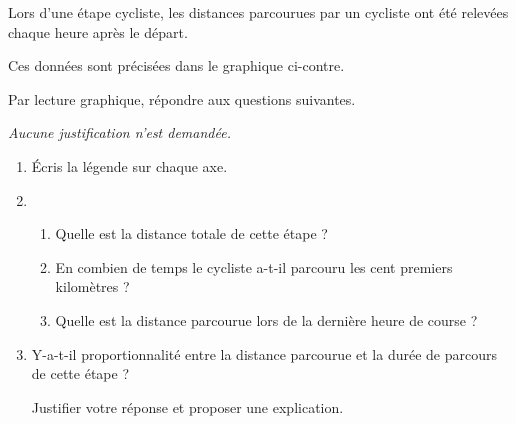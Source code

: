 
\begin{minipage}{0.39\linewidth}
Lors d'une étape cycliste, les distances parcourues par un cycliste ont été relevées
chaque heure après le départ.

Ces données sont précisées dans le graphique ci-contre.

Par lecture graphique, répondre aux questions suivantes.

\emph{Aucune justification n'est demandée.}

\medskip

\begin{enumerate}
\item Écris la légende sur chaque axe.

\item 
	\begin{enumerate}
		\item Quelle est la distance totale de cette étape ?
		\item En combien de temps le cycliste a-t-il parcouru les cent premiers kilomètres ?
		\item Quelle est la distance parcourue lors de la dernière heure de course ?
	\end{enumerate}
\item  Y-a-t-il proportionnalité entre la distance parcourue et la durée de parcours de cette
étape ?
	
Justifier votre réponse et proposer une explication.	
\end{enumerate}


\end{minipage}
